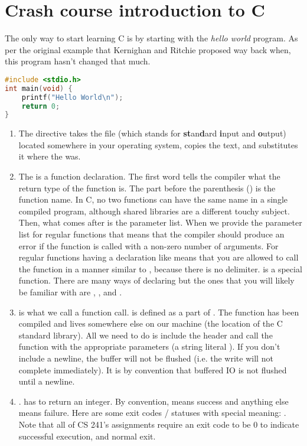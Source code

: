 \section{Crash course introduction to C}

The only way to start learning C is by starting with the \emph{hello world} program. As per the original example that Kernighan and Ritchie proposed way back when, this program hasn't changed that much.

\begin{lstlisting}[language=C]
#include <stdio.h>
int main(void) {
    printf("Hello World\n");
    return 0;
}
\end{lstlisting}

\begin{enumerate}
	\item The  directive takes the file  (which stands for \textbf{st}an\textbf{d}ard \textbf{i}nput and \textbf{o}utput) located somewhere in your operating system, copies the text, and substitutes it where the  was.
	\item The  is a function declaration. The first word  tells the compiler what the return type of the function is. The part before the parenthesis () is the function name. In C, no two functions can have the same name in a single compiled program, although shared libraries are a different touchy subject. Then, what comes after is the parameter list. When we provide the parameter list for regular functions  that means that the compiler should produce an error if the function is called with a non-zero number of arguments. For regular functions having a declaration like  means that you are allowed to call the function in a manner similar to , because there is no delimiter.  is a special function. There are many ways of declaring  but the ones that you will likely be familiar with are , , and .
	\item {} is what we call a function call.  is defined as a part of . The function has been compiled and lives somewhere else on our machine (the location of the C standard library). All we need to do is include the header and call the function with the appropriate parameters (a string literal ). If you don't include a newline, the buffer will not be flushed (i.e. the write will not complete immediately). It is by convention that buffered IO is not flushed until a newline.
	\item {}.  has to return an integer. By convention,  means success and anything else means failure. Here are some exit codes / statuses with special meaning: . Note that all of CS 241's assignments require an exit code to be 0 to indicate successful execution, and normal exit. 
\end{enumerate}

